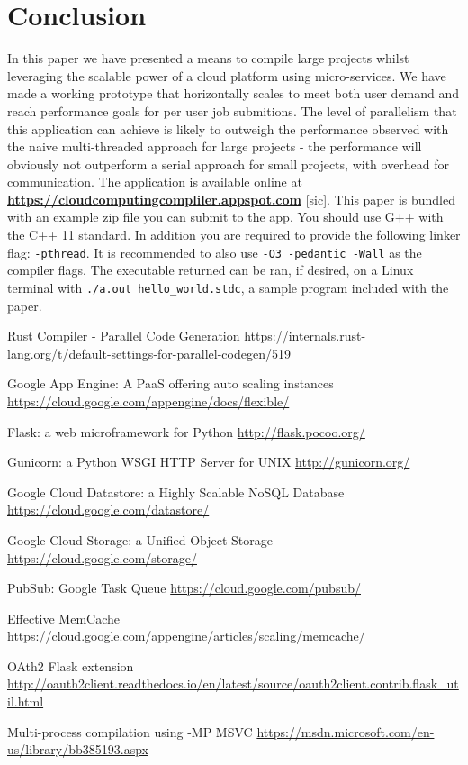 \documentclass[conference]{IEEEtran}
\begin{document}
\section{Conclusion}
In this paper we have presented a means to compile large projects whilst
leveraging the scalable power of a cloud platform using micro-services. We have
made a working prototype that horizontally scales to
meet both user demand and reach performance goals for per user job submitions.
The level of parallelism that this application can achieve is likely to outweigh
the performance observed with the naive multi-threaded approach for large
projects - the performance will obviously not outperform a serial approach for
small projects, with overhead for communication.
The application is available online at
\textbf{\url{https://cloudcomputingcompliler.appspot.com}} [sic].
This paper is bundled with an example zip file you can submit to the app. You
should use G++ with the C++ 11 standard. In addition you are required to provide
the following linker flag: \texttt{-pthread}. It is recommended to also use
\texttt{-O3 -pedantic -Wall} as the compiler flags. The executable returned can
be ran, if desired, on a Linux terminal with \texttt{./a.out hello\_world.stdc},
a sample program included with the paper.

\begin{thebibliography}{00}

    Rust Compiler - Parallel Code Generation
    \url{https://internals.rust-lang.org/t/default-settings-for-parallel-codegen/519}


    Google App Engine: A PaaS offering auto scaling instances
    \url{https://cloud.google.com/appengine/docs/flexible/}

    Flask: a web microframework for Python
    \url{http://flask.pocoo.org/}

    Gunicorn: a Python WSGI HTTP Server for UNIX
    \url{http://gunicorn.org/}

    Google Cloud Datastore: a Highly Scalable NoSQL Database
    \url{https://cloud.google.com/datastore/}

    Google Cloud Storage: a Unified Object Storage
    \url{https://cloud.google.com/storage/}

   PubSub: Google Task Queue
    \url{https://cloud.google.com/pubsub/}

   Effective MemCache
    \url{https://cloud.google.com/appengine/articles/scaling/memcache/} 

   OAth2 Flask extension
    \url{http://oauth2client.readthedocs.io/en/latest/source/oauth2client.contrib.flask_util.html}

 	Multi-process compilation using -MP MSVC
 	\url{https://msdn.microsoft.com/en-us/library/bb385193.aspx}

\end{thebibliography}
\end{document}
